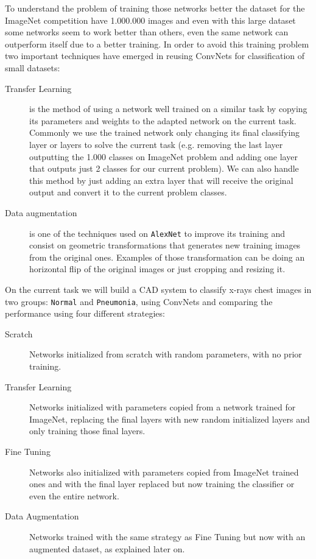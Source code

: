 \documentclass[twocolumn]{article}
\newcommand{\mycite}{\cite}
\begin{document}
To understand the problem of training those networks better the dataset for the ImageNet\mycite{ILSVRC15} competition have 1.000.000 images and even with this large dataset some networks seem to work better than others, even the same network can outperform itself due to a better training. In order to avoid this training problem two important techniques have emerged in reusing ConvNets for classification of small datasets:

\begin{description}
\item[Transfer Learning] is the method of using a network well trained on a similar task by copying its parameters and weights to the adapted network on the current task. Commonly we use the trained network only changing its final classifying layer or layers to solve the current task (e.g. removing the last layer outputting the 1.000 classes on ImageNet problem and adding one layer that outputs just 2 classes for our current problem). We can also handle this method by just adding an extra layer that will receive the original output and convert it to the current problem classes.

\item[Data augmentation] is one of the techniques used on \texttt{AlexNet} \mycite{ImageNet} to improve its training and consist on geometric transformations that generates new training images from the original ones. Examples of those transformation can be doing an horizontal flip of the original images or just cropping and resizing it.

\end{description}

On the current task we will build a CAD system to classify x-rays chest images in two groups: \texttt{Normal} and \texttt{Pneumonia}, using ConvNets and comparing the performance using four different strategies:

\begin{description}
\item[Scratch] Networks initialized from scratch with random parameters, with no prior training.

\item[Transfer Learning] Networks initialized with parameters copied from a network trained for ImageNet, replacing the final layers with new random initialized layers and only training those final layers.

\item[Fine Tuning] Networks also initialized with parameters copied from ImageNet trained ones and with the final layer replaced but now training the classifier or even the entire network.

\item[Data Augmentation] Networks trained with the same strategy as Fine Tuning but now with an augmented dataset, as explained later on.

\end{description}
\end{document}

